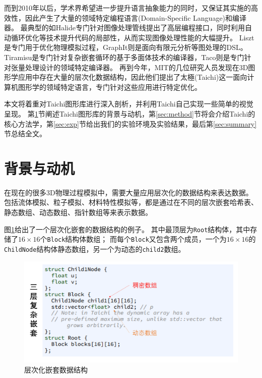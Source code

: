 \documentclass[thesis]{thesis}
\begin{document}
而到2010年以后，学术界希望进一步提升语言抽象能力的同时，又保证其实施的高效性，因此产生了大量的领域特定编程语言(Domain-Specific Language)和编译器。
最典型的如Halide\cite{ragan-kelley_halide_2013}专门针对图像处理管线提出了高层编程接口，同时利用自动循环优化等技术提升代码的局部性，从而实现图像处理性能的大幅提升。
Liszt\cite{zachary_liszt_2011}是专门用于优化物理模拟过程，GraphIt\cite{yunming_graphit_2018}则是面向有限元分析等图处理的DSL。
Tiramisu\cite{riyadh_cgo_2019}是专门针对复杂嵌套循环的基于多面体技术的编译器，Taco\cite{fredrik_taco_2017}则是专门针对张量处理设计的领域特定编译器。
再到今年，MIT的几位研究人员发现在3D图形学应用中存在大量的层次化数据结构，因此他们提出了太極(Taichi)\cite{hu_taichi_2019}这一面向计算机图形学的领域特定语言，专门针对这些应用进行特定优化。

本文将着重对Taichi图形库进行深入剖析，并利用Taichi自己实现一些简单的视觉呈现。
第\ref{sec:bg}节阐述Taichi图形库的背景与动机，第\ref{sec:method}节将会介绍Taichi的核心方法学，第\ref{sec:exp}节给出我们的实验环境及实验结果，最后第\ref{sec:summary}节总结全文。


\section{背景与动机}
\label{sec:bg}
在现在的很多3D物理过程模拟中，需要大量应用层次化的数据结构来表达数据。
包括流体模拟、粒子模拟、材料特性模拟等，都是通过在不同的层次嵌套哈希表、静态数组、动态数组、指针数组等来表示数据。

图\ref{fig:nested}给出了一个层次化嵌套的数据结构的例子。
其中最顶层为\verb'Root'结构体，其中存储了$16\times 16$个\verb'Block'结构体数组；
而每个\verb'Block'又包含两个成员，一个为$16\times 16$的\verb'ChildNode'结构体静态数组，另一个为动态的\verb'child2'数组。
\begin{figure}[htbp]
\centering
\includegraphics[width=0.6\linewidth]{fig/nested.png}
\caption{层次化嵌套数据结构}
\label{fig:nested}
\end{figure}
\end{document}
